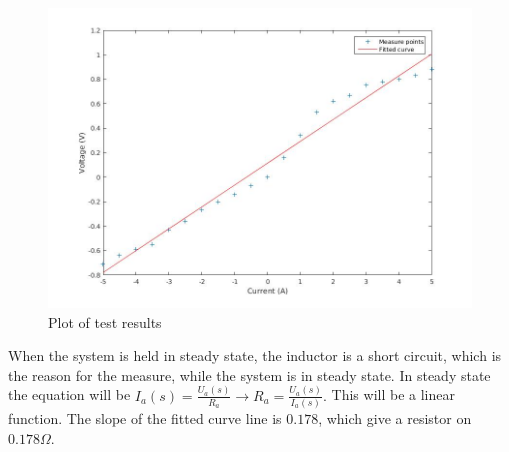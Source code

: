 \begin{figure}[H]
 	\centering
  \includegraphics[scale=.4]{figures/aMotorArmatureResistance}
	\caption{Plot of test results}
\end{figure}

When the system is held in steady state, the inductor is a short circuit, which is the reason for the measure, while the system is in steady state. In steady state the equation will be $I_a (s) = \frac{U_a (s)}{R_a} \longrightarrow R_a = \frac{U_a (s)}{I_a (s)}.$ This will be a linear function. The slope of the fitted curve line is $0.178$, which give a resistor on $0.178 \Omega$.